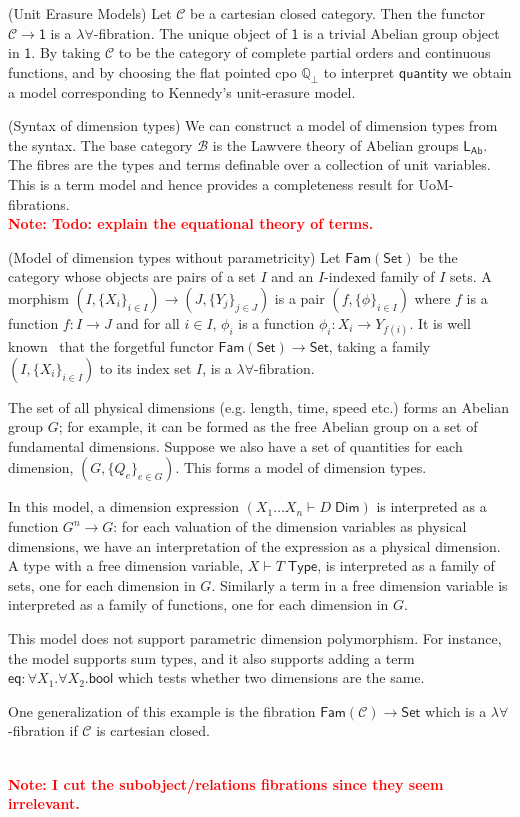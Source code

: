 \documentclass[a4paper,UKenglish]{lipics}
\newcommand\note[1]{{ \bf \textcolor{red} {\vspace{2mm}\; \\ Note: #1\\}}}
\newcommand{\ra}{\rightarrow}
\newcommand{\msf}[1]{\mathsf{#1}} %
\newcommand{\Set}{\msf{Set}}
\newcommand{\Fam}[1]{\msf{Fam}(#1)}
\newcommand{\LAb}{\msf{L}_{\msf{Ab}}}
\newcommand{\terminal}{\msf{1}}
\newcommand{\B}{\mathcal{B}}
\newcommand{\C}{\mathcal{C}}
\newcommand{\bbQ}{\mathbb{Q}}
\newcommand{\num}{\msf{quantity}}
\newcommand{\bool}{\msf{bool}}
\newcommand{\Tj}[2]{#1 \vdash #2 \; \msf{ Type}}
\newcommand{\Dj}[2]{#1 \vdash #2 \; \msf{ Dim}}
\newcommand{\Dim}{D}
\newcommand{\Dvar}{X}
\begin{document}
\begin{example}(Unit Erasure Models)
\label{ex:UnitErasure}
Let $\C$ be a cartesian closed category. Then the functor $\C \ra
\terminal$ is a $\lambda\forall$-fibration.
The unique object of $\terminal$
is a trivial Abelian group object in
$\terminal$. By taking $\C$ to be the category of complete partial
orders and continuous functions, and by choosing the flat pointed cpo
$\bbQ_{\bot}$ to interpret $\num$ we obtain a model
corresponding to Kennedy's unit-erasure model.
\end{example}


\begin{example}(Syntax of dimension types)
We can construct a model of dimension types from the syntax.
The base category $\B$ is the Lawvere theory of Abelian groups $\LAb$.
The
fibres are the types and terms definable over a collection of unit
variables. This is a term model and hence provides a completeness
result for UoM-fibrations.
\note{Todo: explain the equational theory of terms.}\end{example}


\begin{example}(Model of dimension types without parametricity)
Let $\Fam\Set$ be the category whose objects
are pairs of a set $I$ and an $I$-indexed family of $I$ sets.
A morphism $(I,\{X_i\}_{i\in I})\to (J,\{Y_j\}_{j\in J})$
is a pair $(f,\{\phi\}_{i\in I})$ where $f$ is a function $f:I\to J$
and for all $i\in I$, $\phi_i$ is a function $\phi_i:X_i\to Y_{f(i)}$.
It is well known~\cite{} that the forgetful functor $\Fam\Set\to \Set$, taking a family
$(I,\{X_i\}_{i\in I})$ to its index set $I$, is a $\lambda\forall$-fibration.

The set of all physical dimensions (e.g. length, time, speed etc.)
forms an Abelian group $G$; for example, it can be formed as the free Abelian group on a set
of fundamental dimensions.
Suppose we also have a set of quantities for each dimension, $(G,\{Q_e\}_{e\in G})$.
This forms a model of dimension types.

In this model, a dimension expression
$(\Dj{\Dvar_1\dots \Dvar_n} \Dim)$ is interpreted
as a function $G^n\to G$: for each valuation
of the dimension variables as physical dimensions,
we have an interpretation of the expression as a physical dimension.
A type with a free dimension variable, $\Tj \Dvar T$,
is interpreted as a family of sets, one for each dimension in $G$.
Similarly a term in a free dimension variable is interpreted as a family of functions,
one for each dimension in $G$.

This model does not support parametric dimension polymorphism.
For instance, the model supports sum types,
and it also supports adding a term $\mathsf{eq}:\forall \Dvar_1.\forall \Dvar_2.\bool$
which tests whether two dimensions are the same.

One generalization of this example is the fibration $\Fam{\C}\to\Set$
which is a $\lambda\forall$-fibration if $\C$ is cartesian closed.
\end{example}
\note{I cut the subobject/relations fibrations since they seem irrelevant.}
\end{document}
